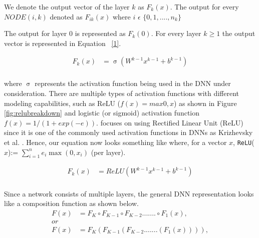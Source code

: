 We denote the output vector of the layer $k$ as $F_k(x)$.
The output for every $NODE(i,k)$ denoted as $F_{ik}(x)$ where $i$ $\epsilon$ $\{0,1,....,n_k\}$ 

The output for layer 0 is represented as $F_k(0)$.
For every layer $k \geq 1$ the output vector is represented in Equation ~\ref{1}. 

\begin{equation}
\label{1}
\begin{aligned}
F_k(x) &= \upsigma(W^{k-1}x^{k-1} + b^{k-1}) \\
\end{aligned}
\end{equation}

where $\upsigma$ represents the activation function being used in the DNN under consideration. 
There are multiple types of activation functions with different modeling capabilities, such as ReLU ($f(x) = max {0,x}$) as shown in Figure 	\ref{fig:relubreakdown} and logistic (or sigmoid) activation function $f(x)=1/(1+ exp(-e))$.
\tool focuses on using Rectified Linear Unit (ReLU) since it is one of the commonly used activation functions in \ac{DNN}s as Krizhevsky et al. \cite{10.1145/3065386}. 
Hence, our equation now  looks something like where, for a vector $x$, \texttt{ReLU}($x$):= $\sum_{i=1}^{n} e_{i}\max(0, x_{i})$ (per layer).



\begin{equation}
\label{2}
\begin{aligned}
F_k(x) &= ReLU(W^{k-1}x^{k-1} + b^{k-1}) \\
\end{aligned}
\end{equation}

Since a network consists of multiple layers, the general \ac{DNN} representation looks like a composition function as shown below. 
\begin{equation}
\label{3}
	\begin{aligned}
	F(x) &= F_K \circ F_{K-1} \circ F_{K-2} ....... \circ F_1(x),    \\
	or \\
	F(x) &= F_K ( F_{K-1}( F_{K-2} .......  (F_1(x)))),    \\
	\end{aligned}
\end{equation}


